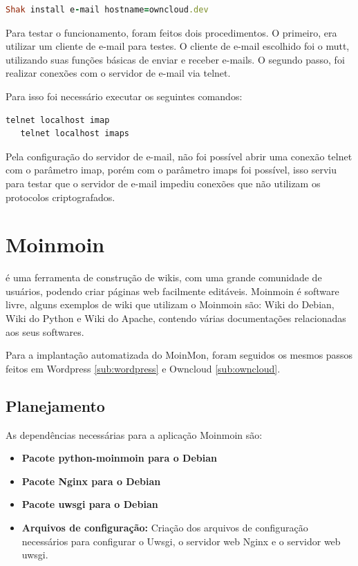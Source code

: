 \begin{lstlisting}[basicstyle=\ttfamily, language=Ruby,label=dice_index,caption={Exemplo de execução de instalação do servidor de e-mail com shak}]
Shak install e-mail hostname=owncloud.dev
\end{lstlisting}

Para testar o funcionamento, foram feitos dois procedimentos. O primeiro, era utilizar
um cliente de e-mail para testes. O cliente de e-mail escolhido foi o mutt, utilizando
suas funções básicas de enviar e receber e-mails. O segundo passo, foi realizar conexões
com o servidor de e-mail via telnet. 

Para isso foi necessário executar os seguintes comandos:

\begin{lstlisting}[basicstyle=\ttfamily, language=Ruby,label=dice_index,caption={Exemplo de teste de conexão telnet no servidor imap}]
   telnet localhost imap
   telnet localhost imaps
\end{lstlisting}

Pela configuração do servidor de e-mail, não foi possível abrir uma conexão telnet
com o parâmetro imap, porém com o parâmetro imaps foi possível, isso serviu para testar 
que o servidor de e-mail impediu conexões que não 
utilizam os protocolos criptografados.

\section{Moinmoin}
\label{sub:moinmoin}

\cite{moin} é uma ferramenta de construção
de wikis, com uma grande comunidade de usuários, podendo criar páginas web
facilmente editáveis. Moinmoin é software livre, alguns exemplos
de wiki que utilizam o Moinmoin são: Wiki do Debian, Wiki do Python e Wiki do Apache,
contendo várias documentações relacionadas aos seus softwares. 

Para a implantação automatizada do MoinMon, foram seguidos os mesmos passos
feitos em Wordpress \ref{sub:wordpress} e Owncloud \ref{sub:owncloud}.

\subsection{Planejamento}

As dependências necessárias para a aplicação Moinmoin são:

\begin{itemize}
   \item \textbf{Pacote python-moinmoin para o Debian}
   \item \textbf{Pacote Nginx para o Debian}
   \item \textbf{Pacote uwsgi para o Debian}
   \item \textbf{Arquivos de configuração:} Criação dos arquivos de configuração
   necessários para configurar o Uwsgi, o servidor web Nginx e o servidor web
uwsgi.
\end{itemize}

